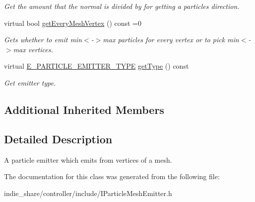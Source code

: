 \begin{DoxyCompactItemize}
\begin{DoxyCompactList}\small\item\em Get the amount that the normal is divided by for getting a particles direction. \end{DoxyCompactList}\item 
\mbox{\label{classirr_1_1scene_1_1IParticleMeshEmitter_a394a9a256d57daf168bf0d770d4d4396}} 
virtual bool \hyperlink{classirr_1_1scene_1_1IParticleMeshEmitter_a394a9a256d57daf168bf0d770d4d4396}{get\+Every\+Mesh\+Vertex} () const =0
\begin{DoxyCompactList}\small\item\em Gets whether to emit min$<$-\/$>$max particles for every vertex or to pick min$<$-\/$>$max vertices. \end{DoxyCompactList}\item 
\mbox{\label{classirr_1_1scene_1_1IParticleMeshEmitter_acb0b3f4c04c12da20e3503773aa2eb2c}} 
virtual \hyperlink{namespaceirr_1_1scene_a3e251a881c886884a78adea2e546272b}{E\+\_\+\+P\+A\+R\+T\+I\+C\+L\+E\+\_\+\+E\+M\+I\+T\+T\+E\+R\+\_\+\+T\+Y\+PE} \hyperlink{classirr_1_1scene_1_1IParticleMeshEmitter_acb0b3f4c04c12da20e3503773aa2eb2c}{get\+Type} () const
\begin{DoxyCompactList}\small\item\em Get emitter type. \end{DoxyCompactList}\end{DoxyCompactItemize}
\subsection*{Additional Inherited Members}


\subsection{Detailed Description}
A particle emitter which emits from vertices of a mesh. 

The documentation for this class was generated from the following file\+:\begin{DoxyCompactItemize}
\item 
indie\+\_\+share/controller/include/I\+Particle\+Mesh\+Emitter.\+h\end{DoxyCompactItemize}
